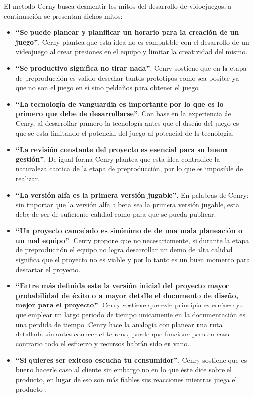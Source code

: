 El metodo Cerny busca desmentir los mitos del desarrollo de vidoejuegos, a continuación se presentan dichos mitos:
	\begin{itemize}
	\item \textbf{“Se puede planear y planificar un horario para la creación de un 
	juego”}. Cerny plantea que esta idea no es compatible con el desarrollo de un 
	videojuego al crear presiones en el equipo y limitar la creatividad del mismo.
	
	\item \textbf{“Se productivo significa no tirar nada”}. Cenry sostiene que en 
	la etapa de preproducción es valido desechar tantos prototipos como sea posible 
	ya que no son el juego en sí sino peldaños para obtener el juego.

	\item \textbf{“La tecnología de vanguardia es importante por lo que es lo primero 
	que debe de desarrollarse”}. Con base en la experiencia de Cenry, al desarrollar 
	primero la tecnología antes que el diseño del juego es que se esta limitando 
	el potencial del juego al potencial de la tecnología.

	\item \textbf{“La revisión constante del proyecto es esencial para su buena 
	gestión”}. De igual forma Cenry plantea que esta idea contradice la naturaleza 
	caotica de la etapa de preproducción, por lo que es imposible de realizar.

	\item \textbf{“La versión alfa es la primera versión jugable”}. En palabras de 
	Cenry: sin importar que la versión alfa o beta sea la primera versión jugable, 
	esta debe de ser de suficiente calidad como para que se pueda publicar.

	\item \textbf{“Un proyecto cancelado es sinónimo de de una mala planeación o un 
	mal equipo”}. Cenry propone que no necesariamente, si durante la etapa de 
	preproducción el equipo no logra desarrollar un demo de alta calidad significa 
	que el proyecto no es viable y por lo tanto es un buen momento para descartar el 
	proyecto.

	\item \textbf{“Entre más definida este la versión inicial del proyecto mayor 
	probabilidad de éxito o a mayor detalle el documento de diseño, mejor para el 
	proyecto”}. Cenry sostiene que este principio es erróneo ya que emplear un largo 
	periodo de tiempo unicamente en la documentación es una perdida de tiempo. Cenry 
	hace la analogía con planear una ruta detallada sin antes conocer el terreno, 
	puede que funcione pero en caso contrario todo el esfuerzo y recursos habrán sido en 
	vano.

	\item \textbf{“Si quieres ser exitoso escucha tu consumidor”}. Cenry sostiene que 
	es bueno hacerle caso al cliente sin embargo no en lo que éste dice sobre el 
	producto, en lugar de eso son más fiables sus reacciones mientras juega el producto 
	\cite{MetodoCerny}.
	\end{itemize}

